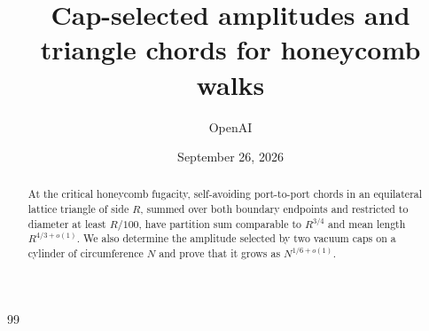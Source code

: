 \documentclass[11pt]{article}
\title{Cap-selected amplitudes and triangle chords for honeycomb walks}
\author{OpenAI}
\date{September 26, 2026}
\numberwithin{equation}{section}
\theoremstyle{definition}
\theoremstyle{remark}
\begin{document}
\maketitle
\begin{abstract}
At the critical honeycomb fugacity, self-avoiding port-to-port chords in an equilateral lattice triangle of side $R$, summed over both boundary endpoints and restricted to diameter at least $R/100$, have partition sum comparable to $R^{3/4}$ and mean length $R^{4/3+o(1)}$. We also determine the amplitude selected by two vacuum caps on a cylinder of circumference $N$ and prove that it grows as $N^{1/6+o(1)}$.
\end{abstract}
\setcounter{tocdepth}{1}
\tableofcontents
\clearpage













\begin{thebibliography}{99}

\end{thebibliography}
\end{document}

